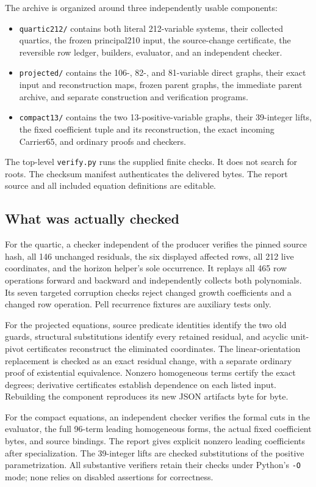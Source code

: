 \documentclass[10pt,letterpaper]{article}
\theoremstyle{remark}\newtheorem{remark}[theorem]{Remark}
\newcommand{\pathtext}[1]{\nolinkurl{#1}}
\begin{document}
The archive is organized around three independently usable components:
\begin{itemize}
\item \pathtext{quartic212/} contains both literal 212-variable systems,
their collected quartics, the frozen principal210 input, the source-change
certificate, the reversible row ledger, builders, evaluator, and an
independent checker.
\item \pathtext{projected/} contains the 106-, 82-, and 81-variable direct
graphs, their exact input and reconstruction maps, frozen parent graphs,
the immediate parent archive, and separate construction and verification
programs.
\item \pathtext{compact13/} contains the two 13-positive-variable graphs,
their 39-integer lifts, the fixed coefficient tuple and its reconstruction,
the exact incoming Carrier65, and ordinary proofs and checkers.
\end{itemize}
The top-level \pathtext{verify.py} runs the supplied finite checks. It does
not search for roots. The checksum manifest authenticates the delivered
bytes. The report source and all included equation definitions are editable.

\subsection{What was actually checked}

For the quartic, a checker independent of the producer verifies the pinned
source hash, all 146 unchanged residuals, the six displayed affected rows,
all 212 live coordinates, and the horizon helper's sole occurrence. It
replays all 465 row operations forward and backward and independently
collects both polynomials. Its seven targeted corruption checks reject
changed growth coefficients and a changed row operation. Pell recurrence
fixtures are auxiliary tests only.

For the projected equations, source predicate identities identify the two
old guards, structural substitutions identify every retained residual,
and acyclic unit-pivot certificates reconstruct the eliminated coordinates.
The linear-orientation replacement is checked as an exact residual change,
with a separate ordinary proof of existential equivalence. Nonzero
homogeneous terms certify the exact degrees; derivative certificates
establish dependence on each listed input. Rebuilding the component
reproduces its new JSON artifacts byte for byte.

For the compact equations, an independent checker verifies the formal
cuts in the evaluator, the full 96-term leading homogeneous forms, the
actual fixed coefficient bytes, and source bindings. The report gives
explicit nonzero leading coefficients after specialization. The
39-integer lifts are checked substitutions of the positive parametrization.
All substantive verifiers retain their checks under Python's \pathtext{-O}
mode; none relies on disabled assertions for correctness.
\end{document}
